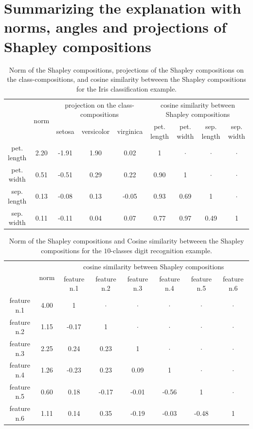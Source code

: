 \documentclass{article}
\theoremstyle{plain}
\theoremstyle{definition}
\theoremstyle{remark}
\begin{document}
\newpage
\section{Summarizing the explanation with norms, angles and projections of Shapley compositions}
\label{app:summarize}

\begin{table}
  \centering
  \caption{Norm of the Shapley compositions, projections of the Shapley compositions on the class-compositions, and cosine similarity betweeen the Shapley compositions for the Iris classification example.}
  \begin{tabular}{c|c|ccc|cccc|}
    \cline{2-9}
    & \multirow{2}{*}{norm} & \multicolumn{3}{c|}{projection on the class-compositions} & \multicolumn{4}{c|}{cosine similarity between Shapley compositions} \\
    \cline{3-9}
     & & \small setosa & \small versicolor & \small virginica & \small pet. length & \small pet. width & \small sep. length & \small sep. width \\
    \hline
    \small pet. length & 2.20  & -1.91 & 1.90 & 0.02 & 1 &$\cdot$ &$\cdot$ &$\cdot$ \\
    \small pet. width & 0.51 & -0.51 & 0.29 & 0.22 & 0.90 & 1 &$\cdot$ &$\cdot$ \\
    \small sep. length & 0.13 & -0.08 & 0.13 & -0.05 & 0.93 & 0.69 & 1 &$\cdot$ \\
    \small sep. width & 0.11 & -0.11 & 0.04 & 0.07 & 0.77 & 0.97 & 0.49 &1 \\
    \hline
  \end{tabular}
  \label{tab:normiris}
\end{table}
\begin{table}
  \centering
  \caption{Norm of the Shapley compositions and Cosine similarity betweeen the Shapley compositions for the $10$-classes digit recognition example.}
  \begin{tabular}{c|c|cccccc|}
    \cline{2-8}
    & \multirow{2}{*}{norm} & \multicolumn{6}{c|}{cosine similarity between Shapley compositions} \\
    \cline{3-8}
     & & \small feature n.1 & \small feature n.2 & \small feature n.3 & \small feature n.4 & \small feature n.5 & \small feature n.6 \\
    \hline
    \small feature n.1 & 4.00 & 1 & $\cdot$ & $\cdot$ & $\cdot$ & $\cdot$ & $\cdot$ \\
    \small feature n.2 & 1.15 & -0.17 & 1 & $\cdot$ & $\cdot$ & $\cdot$ & $\cdot$ \\
    \small feature n.3 & 2.25 & 0.24 & 0.23 & 1 & $\cdot$ & $\cdot$ &$\cdot$ \\
    \small feature n.4 & 1.26 & -0.23 & 0.23 & 0.09 & 1 & $\cdot$ & $\cdot$ \\
    \small feature n.5 & 0.60 & 0.18  & -0.17 & -0.01 & -0.56 & 1 & $\cdot$ \\
    \small feature n.6 & 1.11 & 0.14 & 0.35 &	-0.19 & -0.03 & -0.48 & 1 \\
    \hline
  \end{tabular}
  \label{tab:normdigit}
\end{table}
\end{document}
